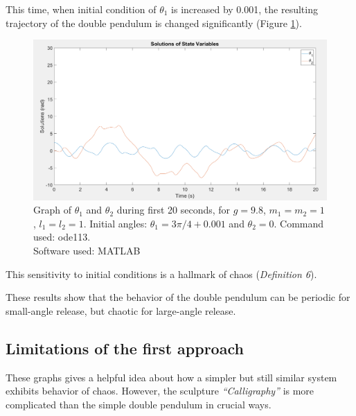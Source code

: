 \documentclass[a4paper,12pt]{article}
\begin{document}
This time, when initial condition of $\theta_1$ is increased by 0.001, the resulting trajectory of the double pendulum is changed significantly (Figure \ref{fig:3pi4-001}).
\begin{figure}[H]
    \centering
    \includegraphics[width=.9\textwidth]{3pi4-001}
    \caption{Graph of $\theta_1$ and $\theta_2$ during first 20 seconds, for $g = 9.8$, $m_1 = m_2 = 1$, $l_1 = l_2 = 1$. Initial angles: $\theta_1 = 3\pi/4+0.001$ and $\theta_2=0$. Command used: ode113. \\Software used: MATLAB}
    \label{fig:3pi4-001}
\end{figure}
This sensitivity to initial conditions is a hallmark of chaos (\textit{Definition 6}). 

These results show that the behavior of the double pendulum can be periodic for small-angle release, but chaotic for large-angle release. 
\subsection{Limitations of the first approach}
These graphs gives a helpful idea about how a simpler but still similar system exhibits behavior of chaos. However, the sculpture \textit{“Calligraphy”} is more complicated than the simple double pendulum in crucial ways.
\end{document}
